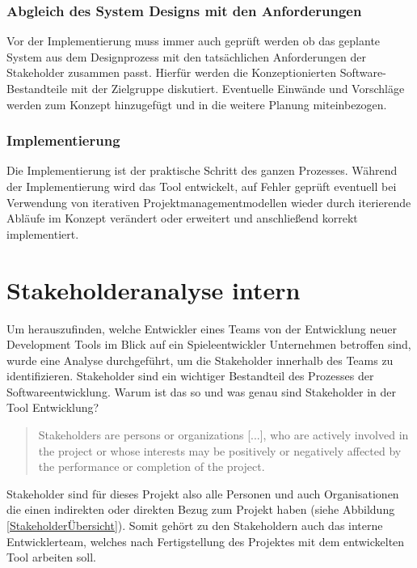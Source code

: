 \documentclass[pagesize, paper=a4, fontsize=12pt, titlepage=true, headings=small, headnosepline, abstractoff, liststotoc, nochapterprefix, plainheadsepline, twoside]{scrreprt}
\begin{document}
\subsubsection{Abgleich des System Designs mit den Anforderungen}
Vor der Implementierung muss immer auch geprüft werden ob das geplante System aus dem Designprozess mit den tatsächlichen Anforderungen der Stakeholder zusammen passt. Hierfür werden die Konzeptionierten Software-Bestandteile mit der Zielgruppe diskutiert. Eventuelle Einwände und Vorschläge werden zum Konzept hinzugefügt und in die weitere Planung miteinbezogen.

\subsubsection{Implementierung}
Die Implementierung ist der praktische Schritt des ganzen Prozesses. Während der Implementierung wird das Tool entwickelt, auf Fehler geprüft eventuell bei Verwendung von iterativen Projektmanagementmodellen wieder durch iterierende Abläufe im Konzept verändert oder erweitert und anschließend korrekt implementiert.

\section{Stakeholderanalyse intern}
Um herauszufinden, welche Entwickler eines Teams von der Entwicklung neuer Development Tools im Blick auf ein Spieleentwickler Unternehmen betroffen sind, wurde eine Analyse durchgeführt, um die Stakeholder innerhalb des Teams zu identifizieren. Stakeholder sind ein wichtiger Bestandteil des Prozesses der Softwareentwicklung. Warum ist das so und was genau sind Stakeholder in der Tool Entwicklung?
\begin{quote}
\glqq Stakeholders are persons or organizations [...], who are actively involved in the project or whose interests may be positively or negatively affected
by the performance or completion of the project.\grqq{} 
\end{quote}
Stakeholder sind für dieses Projekt also alle Personen und auch Organisationen die einen indirekten oder direkten Bezug zum Projekt haben (siehe Abbildung \ref{StakeholderÜbersicht}). Somit gehört zu den Stakeholdern auch das interne Entwicklerteam, welches nach Fertigstellung des Projektes mit dem entwickelten Tool arbeiten soll.
\end{document}
